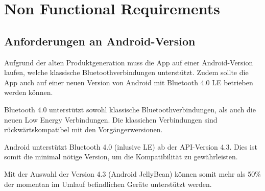 
\section{Non Functional Requirements}
\label{sec:Non Functional Requirements}

\subsection{Anforderungen an Android-Version}
\label{subsec:Non Functional Requirements}
Aufgrund der alten Produktgeneration muss die App auf einer Android-Version laufen, welche klassische Bluetoothverbindungen unterstützt. Zudem sollte die App auch auf einer neuen Version von Android mit Bluetooth 4.0 LE betrieben werden können.

Bluetooth 4.0 unterstützt sowohl klassische Bluetoothverbindungen, als auch die neuen Low Energy Verbindungen. Die klassichen Verbindungen sind rückwärtskompatibel mit den Vorgängerwersionen.\cite{bt_standard}

Android unterstützt Bluetooth 4.0 (inlusive LE) ab der API-Version 4.3\cite{bt_android}. Dies ist somit die minimal nötige Version, um die Kompatibilität zu gewährleisten.

Mit der Auswahl der Version 4.3 (Android JellyBean) können somit mehr als 50\% der momentan im Umlauf \cite{android_distribution} befindlichen Geräte unterstützt werden.